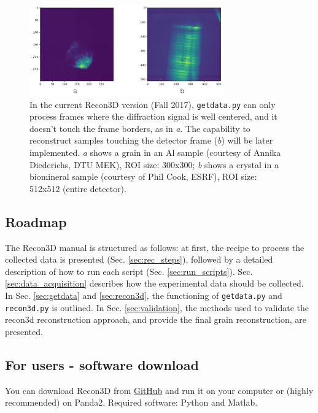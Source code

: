\documentclass[11pt]{scrartcl}
\begin{document}
\begin{figure}[h]
    \centering
    \includegraphics[width=0.75\textwidth]{centered_not_centered}
    \caption{In the current Recon3D version (Fall 2017), {\texttt{getdata.py}} can only process frames where the diffraction signal is well centered, and it doesn't touch the frame borders, as in {\emph{a}}. The capability to reconstruct samples touching the detector frame ({\emph{b}}) will be later implemented. {\emph{a}} shows a grain in an Al sample (courtesy of Annika Diederichs, {\footnotesize{DTU MEK}}), {\footnotesize{ROI}} size: 300x300; {\emph{b}} shows a crystal in a biomineral sample (courtesy of Phil Cook, {\footnotesize{ESRF}}), {\footnotesize{ROI}} size: 512x512 (entire detector).}
    \label{fig:centered_not_centered}
\end{figure}

\subsection{Roadmap}

The Recon3D manual is structured as follows: at first, the recipe to process the collected data is presented (Sec. {\ref{sec:rec_steps}}), followed by a detailed description of how to run each script (Sec. {\ref{sec:run_scripts}}). Sec. {\ref{sec:data_acquisition}} describes how the experimental data should be collected. In Sec. {\ref{sec:getdata}} and {\ref{sec:recon3d}}, the functioning of {\texttt{getdata.py}} and {\texttt{recon3d.py}} is outlined. In Sec. {\ref{sec:validation}}, the methods used to validate the recon3d reconstruction approach, and provide the final grain reconstruction, are presented. 

\subsection{For users - software download}

You can download Recon3D from  \href{https://github.com/albusdemens/Recon3D}{GitHub} and run it on your computer or (highly recommended) on Panda2. Required software: Python and Matlab. 
\end{document}

